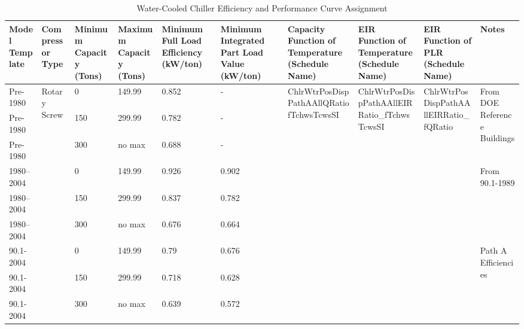 \begin{table}
\scriptsize
\centering
\caption{Water-Cooled Chiller Efficiency and Performance Curve Assignment}
\label{tab:wcc_eff}
\begin{tabular}{|p{0.5in}|p{0.5in}|p{0.4in}|p{0.4in}|p{0.4in}|p{0.4in}|p{0.5in}|p{0.5in}|p{0.5in}|p{0.4in}|}
\hline
\textbf{Model Template} &
  \textbf{Compressor Type} &
  \textbf{Minimum Capacity (Tons)} &
  \textbf{Maximum Capacity (Tons)} &
  \textbf{Minimum Full Load Efficiency (kW/ton)} &
  \textbf{Minimum Integrated Part Load Value (kW/ton)} &
  \textbf{Capacity Function of Temperature (Schedule Name)} &
  \textbf{EIR Function of Temperature (Schedule Name)} &
  \textbf{EIR Function of PLR (Schedule Name)} &
  \textbf{Notes} \\ \hline
Pre-1980 &
  \multirow{32}{*}{\parbox{0.5in}{Rotary   Screw}} &
  0 & 149.99 & 0.852 & - &
  \multirow{9}{*}{\parbox{0.5in}{ChlrWtr\-PosDispPath\-AAll\-QRatio\-fTchws\-TcwsSI}} &
  \multirow{9}{*}{\parbox{0.5in}{ChlrWtr\-PosDispPath\-AAll\-EIRRatio\_fTchwsTcwsSI}} &
  \multirow{32}{*}{\parbox{0.5in}{ChlrWtr\-PosDispPath\-AAll\-EIRRatio\_fQRatio}} &
  \multirow{3}{*}{\parbox{0.5in}{From   DOE Reference Buildings}} \\ \cline{1-1} \cline{3-6}
Pre-1980  &  & 150 & 299.99 & 0.782 & -     &  &  &  &                                        \\ \cline{1-1} \cline{3-6}
Pre-1980  &  & 300 & no max   & 0.688 & -     &  &  &  &                                        \\ \cline{1-1} \cline{3-6} \cline{10-10} 
1980--2004 &  & 0   & 149.99 & 0.926 & 0.902 &  &  &  & \multirow{3}{*}{\parbox{0.5in}{From   90.1-1989}}      \\ \cline{1-1} \cline{3-6}
1980--2004 &  & 150 & 299.99 & 0.837 & 0.782 &  &  &  &                                        \\ \cline{1-1} \cline{3-6}
1980--2004 &  & 300 & no max   & 0.676 & 0.664 &  &  &  &                                        \\ \cline{1-1} \cline{3-6} \cline{10-10} 
90.1-2004 &  & 0   & 149.99 & 0.79  & 0.676 &  &  &  & \multirow{3}{*}{\parbox{0.5in}{Path   A Efficiencies}} \\ \cline{1-1} \cline{3-6}
90.1-2004 &  & 150 & 299.99 & 0.718 & 0.628 &  &  &  &                                        \\ \cline{1-1} \cline{3-6}
90.1-2004 &  & 300 & no max   & 0.639 & 0.572 &  &  &  &                                        \\ \cline{1-1} \cline{3-8} \cline{10-10} 

\end{tabular}
\end{table}
